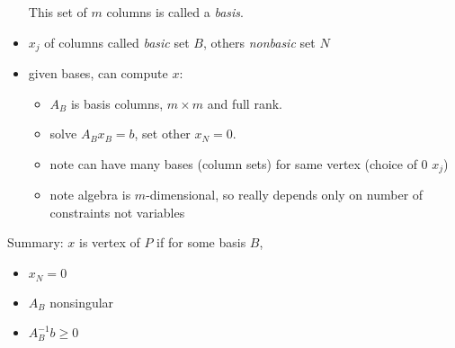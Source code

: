 \documentclass{article}
\begin{document}
\begin{itemize}
\begin{itemize}
	\end{itemize}
	This set of $m$ columns is called a {\em basis}.
	\item $x_j$ of columns called {\em basic} set $B$, others {\em
		nonbasic} set $N$
	\item given bases, can compute $x$:
	\begin{itemize}
		\item $A_B$ is basis columns, $m \times m$ and full rank.
		\item solve $A_B x_B = b$, set other $x_N=0$.
		\item note can have many bases (column sets) for same vertex (choice of 0 $x_j$)
		\item note algebra is $m$-dimensional, so really depends only on number of
		constraints not variables
	\end{itemize}
\end{itemize}

Summary: $x$ is vertex of $P$ if for some basis $B$,
\begin{itemize}
	\item $x_N=0$
	\item $A_B$ nonsingular
	\item $A_B^{-1} b \ge 0$
\end{itemize}
\end{document}
